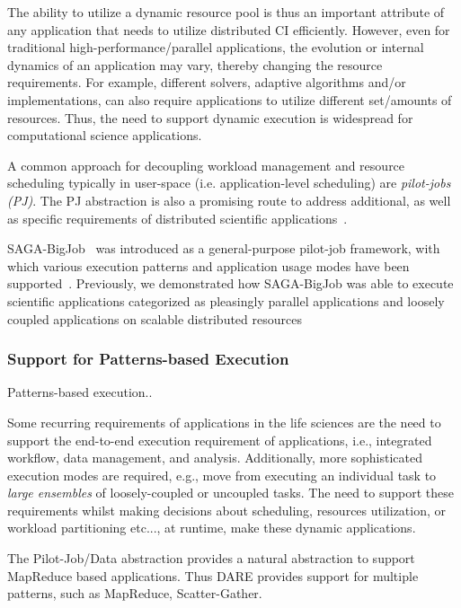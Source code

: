 \documentclass[]{svjour3}
\begin{document}
The ability to utilize a dynamic resource pool is thus an important
attribute of any application that needs to utilize distributed CI
efficiently.  However, even for traditional high-performance/parallel
applications, the evolution or internal dynamics of an application may
vary, thereby changing the resource requirements.  For example,
different solvers, adaptive algorithms and/or implementations, can
also require applications to utilize different set/amounts of
resources.  Thus, the need to support dynamic execution is widespread
for computational science applications.

A common approach for decoupling workload management and resource
scheduling typically in user-space (i.e. application-level scheduling)
are \emph{pilot-jobs (PJ)}.  The PJ abstraction is also a promising
route to address additional, as well as specific requirements of
distributed scientific
applications~\cite{ko-efficient,bigjob_cloudcom10}.
 
SAGA-BigJob~\cite{saga-ccgrid10} was introduced as a general-purpose
pilot-job framework, with which various execution patterns and
application usage modes have been
supported~\cite{async_repex11,saga-royalsoc}. Previously, we
demonstrated how SAGA-BigJob was able to execute scientific
applications categorized as pleasingly parallel applications and
loosely coupled applications on scalable distributed
resources\cite{jha2009developing, ecmls10, ecmls11}

\subsubsection{Support for Patterns-based Execution}

Patterns-based execution.. 

Some recurring requirements of applications in the life sciences are
the need to support the end-to-end execution requirement of
applications, i.e., integrated workflow, data management, and
analysis. Additionally, more sophisticated execution modes are
required, e.g., move from executing an individual task to
\textit{large ensembles} of loosely-coupled or uncoupled tasks. The
need to support these requirements whilst making decisions about
scheduling, resources utilization, or workload partitioning etc..., at
runtime, make these dynamic applications.

The Pilot-Job/Data abstraction provides a natural abstraction to
support MapReduce based applications. Thus DARE provides support for
multiple patterns, such as MapReduce, Scatter-Gather.
 
\end{document}
